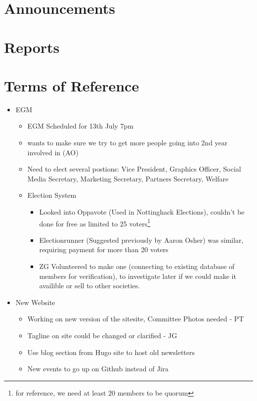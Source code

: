 \documentclass[11pt,hacksoc]{meetingmins}
\begin{document}
\maketitle

\section{Announcements}


\section{Reports}


\section{Terms of Reference}
\begin{itemize}
\item EGM
\begin{itemize}
 \item  EGM Scheduled for 13th July 7pm 
 \item wants to make sure we try to get more people going into 2nd year involved in (AO)
 \item Need to elect several postions: Vice President, Graphics Officer, Social Media Secretary, Marketing Secretary, Partners Secretary, Welfare
 \item Election System
 \begin{itemize}
   \item Looked into Oppavote (Used in Nottinghack Elections), couldn't be done for free as limited to 25 voters\footnote{for reference, we need at least 20 members to be quorum}
   \item Electionrunner (Suggested previously by Aaron Osher) was similar, requiring payment for more than 20 voters
   \item ZG Volunteered to make one (connecting to existing database of members for verification), to investigate later if we could make it availible or sell to other societies.
 \end{itemize}
\end{itemize}

\item New Website
\begin{itemize}
  \item Working on new version of the sitesite, Committee Photos needed - PT
  \item Tagline on site could be changed or clarified - JG
  \item Use blog section from Hugo site to host old newsletters
  \item New events to go up on Github instead of Jira
\end{itemize}
 

\end{itemize}
\end{document}
